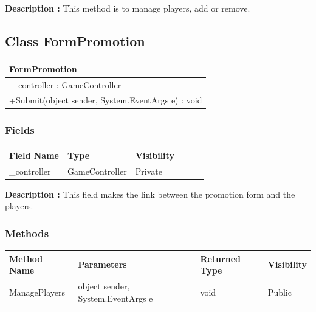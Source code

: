 \documentclass[12pt]{article}
\begin{document}
\textbf{Description :} This method is to manage players, add or remove.

\newpage


\subsection{Class FormPromotion}

\begin{table}[H]
    \begin{tabular}{|l|}
    \hline
    \rowcolor[HTML]{C0C0C0} 
    \textbf{FormPromotion}                            \\ \hline
    \rowcolor[HTML]{EFEFEF} 
    -\_controller : GameController                    \\ \hline
    \rowcolor[HTML]{FFFFFF} 
    +Submit(object sender, System.EventArgs e) : void \\ \hline
    \end{tabular}
\end{table}

\subsubsection{Fields}

\begin{table}[H]
    \begin{tabular}{llllll}
    \hline
    \multicolumn{1}{|l|}{\cellcolor[HTML]{EFEFEF}\textbf{Field Name}} & \multicolumn{1}{l|}{\cellcolor[HTML]{EFEFEF}\textbf{Type}} & \multicolumn{1}{l|}{\cellcolor[HTML]{EFEFEF}\textbf{Visibility}} \\ \hline
    \multicolumn{1}{|l|}{\_controller}                                & \multicolumn{1}{l|}{GameController}                        & \multicolumn{1}{l|}{Private}                                     \\ \hline
    \end{tabular}
\end{table}

\textbf{Description :} This field makes the link between the promotion form and the players.

\subsubsection{Methods}

\begin{table}[H]
    \begin{tabular}{|l|l|l|l|}
    \hline
    \rowcolor[HTML]{EFEFEF} 
    \cellcolor[HTML]{EFEFEF}\textbf{Method Name} & \textbf{Parameters}                    & \textbf{Returned Type} & \textbf{Visibility} \\ \hline
    ManagePlayers                                        & object sender, System.EventArgs e      & void                   & Public             \\ \hline
    \end{tabular}
\end{table}
\end{document}
